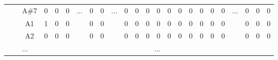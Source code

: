 \documentclass[12pt]{article}
\begin{document}
\begin{table}[!ht]
{\begin{tabular}{clcccccccccccccccccccccc}
								   & \multicolumn{1}{l|}{}                   & \multicolumn{1}{c|}{A\#7} & \multicolumn{1}{c|}{0}    & \multicolumn{1}{c|}{0}    & \multicolumn{1}{c|}{0}    & \multicolumn{1}{c|}{\multirow{3}{*}{...}} & \multicolumn{1}{c|}{0}    & \multicolumn{1}{c|}{0}  & \multicolumn{1}{c|}{\multirow{3}{*}{...}} & \multicolumn{1}{c|}{0}  & \multicolumn{1}{c|}{0}  & \multicolumn{1}{c|}{0}  & \multicolumn{1}{c|}{0}  & \multicolumn{1}{c|}{0}    & \multicolumn{1}{c|}{0}    & \multicolumn{1}{c|}{0}    & \multicolumn{1}{c|}{0}    & \multicolumn{1}{c|}{0}    & \multicolumn{1}{c|}{0}    & \multicolumn{1}{c|}{\multirow{3}{*}{...}} & \multicolumn{1}{c|}{0}  & \multicolumn{1}{c|}{0}  & \multicolumn{1}{c|}{0}  \\ \cline{3-6} \cline{8-9} \cline{11-20} \cline{22-24} 
								   & \multicolumn{1}{l|}{}                   & \multicolumn{1}{c|}{A1}   & \multicolumn{1}{c|}{1}    & \multicolumn{1}{c|}{0}    & \multicolumn{1}{c|}{0}    & \multicolumn{1}{c|}{}                     & \multicolumn{1}{c|}{0}    & \multicolumn{1}{c|}{0}  & \multicolumn{1}{c|}{}                     & \multicolumn{1}{c|}{0}  & \multicolumn{1}{c|}{0}  & \multicolumn{1}{c|}{0}  & \multicolumn{1}{c|}{0}  & \multicolumn{1}{c|}{0}    & \multicolumn{1}{c|}{0}    & \multicolumn{1}{c|}{0}    & \multicolumn{1}{c|}{0}    & \multicolumn{1}{c|}{0}    & \multicolumn{1}{c|}{0}    & \multicolumn{1}{c|}{}                     & \multicolumn{1}{c|}{0}  & \multicolumn{1}{c|}{0}  & \multicolumn{1}{c|}{0}  \\ \cline{3-6} \cline{8-9} \cline{11-20} \cline{22-24} 
								   & \multicolumn{1}{l|}{}                   & \multicolumn{1}{c|}{A2}   & \multicolumn{1}{c|}{0}    & \multicolumn{1}{c|}{0}    & \multicolumn{1}{c|}{0}    & \multicolumn{1}{c|}{}                     & \multicolumn{1}{c|}{0}    & \multicolumn{1}{c|}{0}  & \multicolumn{1}{c|}{}                     & \multicolumn{1}{c|}{0}  & \multicolumn{1}{c|}{0}  & \multicolumn{1}{c|}{0}  & \multicolumn{1}{c|}{0}  & \multicolumn{1}{c|}{0}    & \multicolumn{1}{c|}{0}    & \multicolumn{1}{c|}{0}    & \multicolumn{1}{c|}{0}    & \multicolumn{1}{c|}{0}    & \multicolumn{1}{c|}{0}    & \multicolumn{1}{c|}{}                     & \multicolumn{1}{c|}{0}  & \multicolumn{1}{c|}{0}  & \multicolumn{1}{c|}{0}  \\ \cline{3-6} \cline{8-9} \cline{11-20} \cline{22-24} 
								   & \multicolumn{1}{l|}{}                   & \multicolumn{1}{l|}{...}  & \multicolumn{21}{c|}{...}                                                                                                                                                                                                                                                                                                                                                                                                                                                                                                                                                                                                                 \\ \cline{3-6} \cline{8-9} \cline{11-20} \cline{22-24} 

\end{tabular}}
\end{table}
\end{document}

